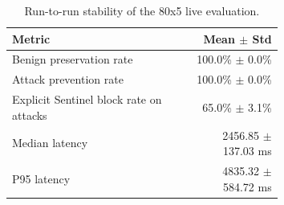 \begin{table}[t]
\centering
\small
\renewcommand{\arraystretch}{1.12}
\setlength{\tabcolsep}{6pt}
\caption{Run-to-run stability of the 80x5 live evaluation.}
\label{tab:live_eval_stability}
\begin{tabular}{@{}p{0.67\linewidth}r@{}}
\toprule
Metric & Mean $\pm$ Std \\
\midrule
Benign preservation rate & 100.0\% $\pm$ 0.0\% \\
Attack prevention rate & 100.0\% $\pm$ 0.0\% \\
Explicit Sentinel block rate on attacks & 65.0\% $\pm$ 3.1\% \\
Median latency & 2456.85 $\pm$ 137.03 ms \\
P95 latency & 4835.32 $\pm$ 584.72 ms \\
\bottomrule
\end{tabular}
\end{table}
